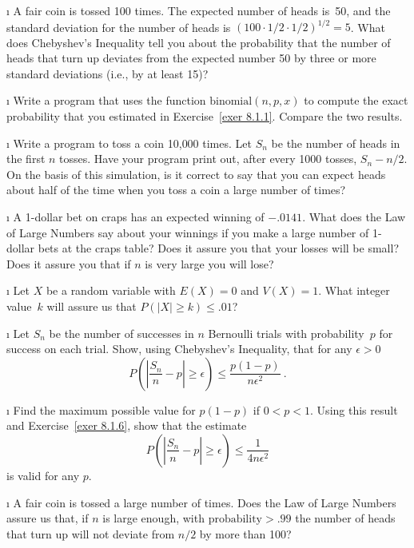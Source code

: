 \exercises
\begin{LJSItem}

\i\label{exer 8.1.1} A fair coin is tossed 100 times.  The expected number of
heads is~50, and the standard deviation for the number of heads is $(100 \cdot
1/2 \cdot 1/2)^{1/2} = 5$.  What does Chebyshev's Inequality tell you about the
probability that the number of heads that turn up deviates from the expected
number 50 by three or more standard deviations (i.e., by at least 15)?

\i\label{exer 8.1.100} Write a program that uses the function 
$\mbox {binomial}(n,p,x)$ to compute the exact probability that you estimated in
Exercise~\ref{exer 8.1.1}.  Compare the two results.

\i\label{exer 8.1.101} Write a program to toss a coin 10{,}000 times.  Let $S_n$ be the
number of heads in the first $n$ tosses.  Have your program print out, after every
1000 tosses, $S_n - n/2$.  On the basis of this simulation, is it correct to
say that you can expect heads about half of the time when you toss a coin a
large number of times?

\i\label{exer 8.1.102} A 1-dollar bet on craps has an expected winning of $-.0141$.  What
does the Law of Large Numbers say about your winnings if you make a large number of
1-dollar bets at the craps table?  Does it assure you that your losses will be
small?  Does it assure you that if $n$ is very large you will lose?

\i\label{exer 8.1.103} Let $X$ be a random variable with $E(X) =0$ and $V(X) = 1$.  What
integer value~$k$ will assure us that $P(|X| \geq k) \leq .01$?

\i\label{exer 8.1.6} Let $S_n$ be the number of successes in $n$ Bernoulli
trials with probability~$p$ for success on each trial.  Show, using Chebyshev's
Inequality, that for any $\epsilon > 0$
$$
P\left( \left| \frac {S_n}n - p \right| \geq \epsilon \right) \leq \frac {p(1 -
p)}{n\epsilon^2}\ .
$$

\i\label{exer 8.1.7} Find the maximum possible value for $p(1 - p)$ if $0 < p
< 1$.  Using this result and Exercise~\ref{exer 8.1.6}, show that the estimate
$$
P\left( \left| \frac {S_n}n - p \right| \geq \epsilon \right) \leq \frac
1{4n\epsilon^2}
$$
is valid for any $p$.

\i\label{exer 8.1.104} A fair coin is tossed a large number of times.  Does the Law of Large
Numbers assure us that, if $n$ is large enough, with $\mbox {probability} >
.99$ the number of heads that turn up will not deviate from $n/2$ by more than
100?


\end{LJSItem}
